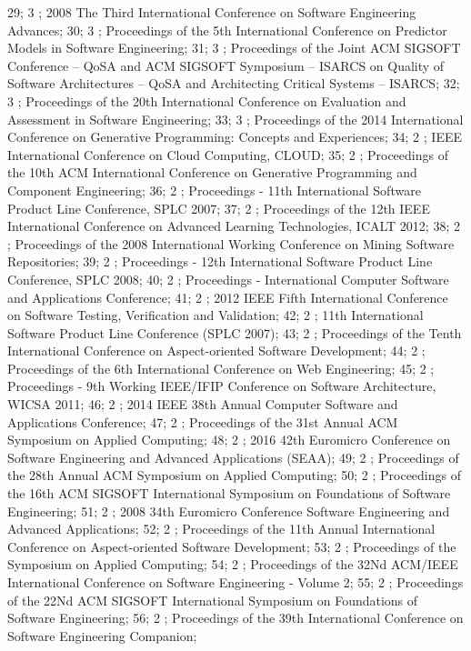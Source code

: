 29; 3 ; 2008 The Third International Conference on Software Engineering Advances; 
30; 3 ; Proceedings of the 5th International Conference on Predictor Models in Software Engineering; 
31; 3 ; Proceedings of the Joint ACM SIGSOFT Conference -- QoSA and ACM SIGSOFT Symposium -- ISARCS on Quality of Software Architectures -- QoSA and Architecting Critical Systems -- ISARCS; 
32; 3 ; Proceedings of the 20th International Conference on Evaluation and Assessment in Software Engineering; 
33; 3 ; Proceedings of the 2014 International Conference on Generative Programming: Concepts and Experiences; 
34; 2 ; IEEE International Conference on Cloud Computing, CLOUD; 
35; 2 ; Proceedings of the 10th ACM International Conference on Generative Programming and Component Engineering; 
36; 2 ; Proceedings - 11th International Software Product Line Conference, SPLC 2007; 
37; 2 ; Proceedings of the 12th IEEE International Conference on Advanced Learning Technologies, ICALT 2012; 
38; 2 ; Proceedings of the 2008 International Working Conference on Mining Software Repositories; 
39; 2 ; Proceedings - 12th International Software Product Line Conference, SPLC 2008; 
40; 2 ; Proceedings - International Computer Software and Applications Conference; 
41; 2 ; 2012 IEEE Fifth International Conference on Software Testing, Verification and Validation; 
42; 2 ; 11th International Software Product Line Conference (SPLC 2007); 
43; 2 ; Proceedings of the Tenth International Conference on Aspect-oriented Software Development; 
44; 2 ; Proceedings of the 6th International Conference on Web Engineering; 
45; 2 ; Proceedings - 9th Working IEEE/IFIP Conference on Software Architecture, WICSA 2011; 
46; 2 ; 2014 IEEE 38th Annual Computer Software and Applications Conference; 
47; 2 ; Proceedings of the 31st Annual ACM Symposium on Applied Computing; 
48; 2 ; 2016 42th Euromicro Conference on Software Engineering and Advanced Applications (SEAA); 
49; 2 ; Proceedings of the 28th Annual ACM Symposium on Applied Computing; 
50; 2 ; Proceedings of the 16th ACM SIGSOFT International Symposium on Foundations of Software Engineering; 
51; 2 ; 2008 34th Euromicro Conference Software Engineering and Advanced Applications; 
52; 2 ; Proceedings of the 11th Annual International Conference on Aspect-oriented Software Development; 
53; 2 ; Proceedings of the Symposium on Applied Computing; 
54; 2 ; Proceedings of the 32Nd ACM/IEEE International Conference on Software Engineering - Volume 2; 
55; 2 ; Proceedings of the 22Nd ACM SIGSOFT International Symposium on Foundations of Software Engineering; 
56; 2 ; Proceedings of the 39th International Conference on Software Engineering Companion; 
